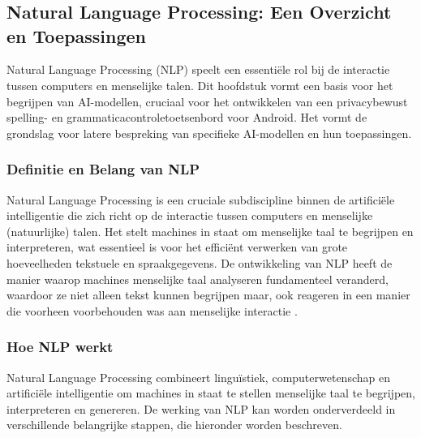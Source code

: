 \chapter{}%
\label{ch:stand-van-zaken}



\section{Natural Language Processing: Een Overzicht en Toepassingen}

Natural Language Processing (NLP) speelt een essentiële rol bij de interactie tussen computers en menselijke talen. Dit hoofdstuk vormt een basis voor het begrijpen van AI-modellen, cruciaal voor het ontwikkelen van een privacybewust spelling- en grammaticacontroletoetsenbord voor Android. Het vormt de grondslag voor latere bespreking van specifieke AI-modellen en hun toepassingen.


\subsection{Definitie en Belang van NLP}

Natural Language Processing is een cruciale subdiscipline binnen de artificiële intelligentie die zich richt op de interactie tussen computers en menselijke (natuurlijke) talen. Het stelt machines in staat om menselijke taal te begrijpen en interpreteren, wat essentieel is voor het efficiënt verwerken van grote hoeveelheden tekstuele en spraakgegevens. De ontwikkeling van NLP heeft de manier waarop machines menselijke taal analyseren fundamenteel veranderd, w\-aar\-door ze niet alleen tekst kunnen begrijpen maar, ook reageren in een manier die voorheen voorbehouden was aan menselijke interactie \autocite{Sanadi2022}.

\subsection{Hoe NLP werkt}

Natural Language Processing combineert linguïstiek, computerwetenschap en artificiële intelligentie om machines in staat te stellen menselijke taal te begrijpen, interpreteren en genereren. De werking van NLP kan worden onderverdeeld in verschillende belangrijke stappen, die hieronder worden beschreven.


